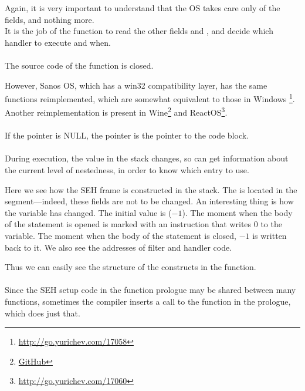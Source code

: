 

Again, it is very important to understand that the \ac{OS} takes care only of the  fields, and nothing more.\\
It is the job of the  function to read the other fields and , and decide
which handler to execute and when.\\
\\
The source code of the  function is closed.

However, Sanos OS, which has a win32 compatibility layer, has the same
functions reimplemented, which are somewhat equivalent to those in Windows
\footnote{\url{http://go.yurichev.com/17058}}.
Another reimplementation is present in 
Wine\footnote{\href{http://go.yurichev.com/17059}{GitHub}}
and ReactOS\footnote{\url{http://go.yurichev.com/17060}}.\\
\\
If the  pointer is NULL, the  
pointer is the pointer to the  code block.\\
\\
During execution, the  value in the stack changes, so
 can get information about the current level of nestedness, 
in order to know which  entry to use.






Here we see how the SEH frame is constructed in the stack.
The  is located in the  segment---indeed, these fields are not to be changed.
An interesting thing is how the  variable has changed.
The initial value is  ($-1$).
The moment when the body of the  
statement is opened is marked with an instruction that writes 0 to the variable.
The moment when the body of the  statement is closed, $-1$ 
is written back to it.
We also see the addresses of filter and handler code.

Thus we can easily see the structure of the  constructs in the function.\\
\\
Since the SEH setup code in the function prologue may be shared between many functions,
sometimes the compiler inserts a call to the  function in the prologue, which does just that.

